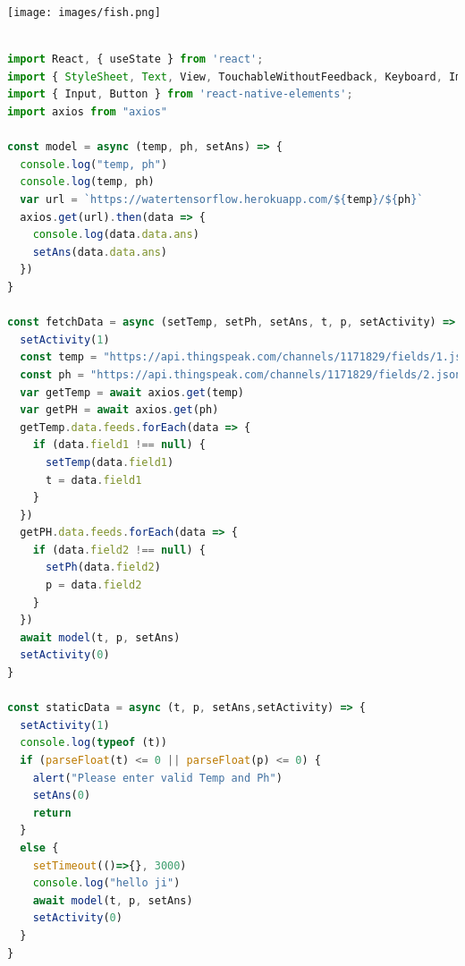 \texttt{[image: images/fish.png]}\\

\begin{lstlisting}[language=javascript, caption={Mobile App Water Monitoring}]

import React, { useState } from 'react';
import { StyleSheet, Text, View, TouchableWithoutFeedback, Keyboard, Image, ActivityIndicator } from 'react-native';
import { Input, Button } from 'react-native-elements';
import axios from "axios"

const model = async (temp, ph, setAns) => {
  console.log("temp, ph")
  console.log(temp, ph)
  var url = `https://watertensorflow.herokuapp.com/${temp}/${ph}`
  axios.get(url).then(data => {
    console.log(data.data.ans)
    setAns(data.data.ans)
  })
}

const fetchData = async (setTemp, setPh, setAns, t, p, setActivity) => {
  setActivity(1)
  const temp = "https://api.thingspeak.com/channels/1171829/fields/1.json?api_key=EQMSTCUEFF2GMM76&results=2"
  const ph = "https://api.thingspeak.com/channels/1171829/fields/2.json?api_key=EQMSTCUEFF2GMM76&results=2"
  var getTemp = await axios.get(temp)
  var getPH = await axios.get(ph)
  getTemp.data.feeds.forEach(data => {
    if (data.field1 !== null) {
      setTemp(data.field1)
      t = data.field1
    }
  })
  getPH.data.feeds.forEach(data => {
    if (data.field2 !== null) {
      setPh(data.field2)
      p = data.field2
    }
  })
  await model(t, p, setAns)
  setActivity(0)
}

const staticData = async (t, p, setAns,setActivity) => {
  setActivity(1)
  console.log(typeof (t))
  if (parseFloat(t) <= 0 || parseFloat(p) <= 0) {
    alert("Please enter valid Temp and Ph")
    setAns(0)
    return
  }
  else {
    setTimeout(()=>{}, 3000)
    console.log("hello ji")
    await model(t, p, setAns)
    setActivity(0)
  }
}


\end{lstlisting}
